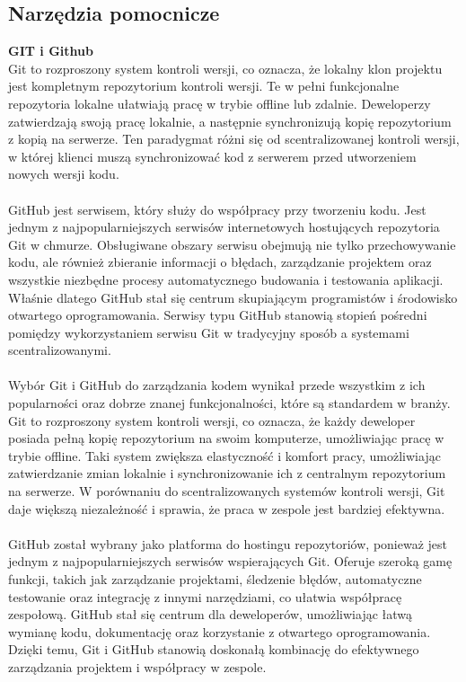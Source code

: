 \documentclass[12pt,a4paper]{article}
\begin{document}
\subsection{Narzędzia pomocnicze}
\noindent \textbf{GIT i Github}\\
Git to rozproszony system kontroli wersji, co oznacza, że lokalny klon projektu jest kompletnym repozytorium kontroli wersji. Te w pełni funkcjonalne repozytoria lokalne ułatwiają pracę w trybie offline lub zdalnie. Deweloperzy zatwierdzają swoją pracę lokalnie, a następnie synchronizują kopię repozytorium z kopią na serwerze. Ten paradygmat różni się od scentralizowanej kontroli wersji, w której klienci muszą synchronizować kod z serwerem przed utworzeniem nowych wersji kodu.
\\\\
GitHub jest serwisem, który służy do współpracy przy tworzeniu kodu. Jest jednym z najpopularniejszych serwisów internetowych hostujących repozytoria Git w chmurze. Obsługiwane obszary serwisu obejmują nie tylko przechowywanie kodu, ale również zbieranie informacji o błędach, zarządzanie projektem oraz wszystkie niezbędne procesy automatycznego budowania i testowania aplikacji. Właśnie dlatego GitHub stał się centrum skupiającym programistów i środowisko otwartego oprogramowania. Serwisy typu GitHub stanowią stopień pośredni pomiędzy wykorzystaniem serwisu Git w tradycyjny sposób a systemami scentralizowanymi.
\\\\
Wybór Git i GitHub do zarządzania kodem wynikał przede wszystkim z ich popularności oraz dobrze znanej funkcjonalności, które są standardem w branży. Git to rozproszony system kontroli wersji, co oznacza, że każdy deweloper posiada pełną kopię repozytorium na swoim komputerze, umożliwiając pracę w trybie offline. Taki system zwiększa elastyczność i komfort pracy, umożliwiając zatwierdzanie zmian lokalnie i synchronizowanie ich z centralnym repozytorium na serwerze. W porównaniu do scentralizowanych systemów kontroli wersji, Git daje większą niezależność i sprawia, że praca w zespole jest bardziej efektywna.
\\\\
GitHub został wybrany jako platforma do hostingu repozytoriów, ponieważ jest jednym z najpopularniejszych serwisów wspierających Git. Oferuje szeroką gamę funkcji, takich jak zarządzanie projektami, śledzenie błędów, automatyczne testowanie oraz integrację z innymi narzędziami, co ułatwia współpracę zespołową. GitHub stał się centrum dla deweloperów, umożliwiając łatwą wymianę kodu, dokumentację oraz korzystanie z otwartego oprogramowania. Dzięki temu, Git i GitHub stanowią doskonałą kombinację do efektywnego zarządzania projektem i współpracy w zespole.
\\\\
\end{document}
